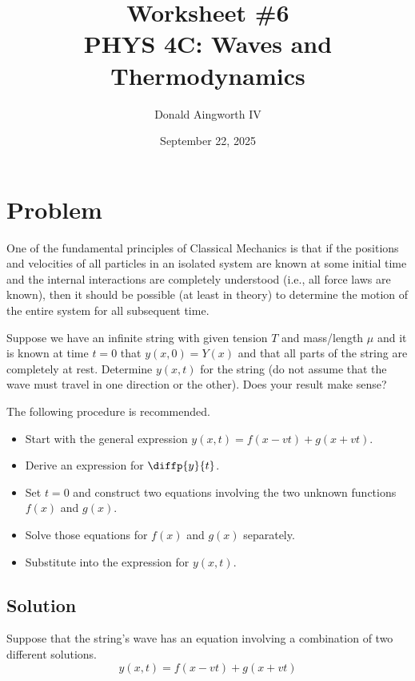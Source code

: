 \documentclass[12pt]{article}
\title{
    Worksheet \#6
    \\  \small
    PHYS 4C: Waves and Thermodynamics
    }
\author{Donald Aingworth IV}
\date{September 22, 2025}
\begin{document}

    \maketitle

    \setcounter{section}{1}
    \section*{Problem}
        One of the fundamental principles of Classical Mechanics is that if the positions and velocities of all particles in an isolated system are known at some initial time and the internal interactions are completely understood (i.e., all force laws are known), then it should be possible (at least in theory) to determine the motion of the entire system for all subsequent time.
        
        Suppose we have an infinite string with given tension $T$ and mass/length $\mu$ and it is known at time $t = 0$ that $y(x,0) = Y(x)$ and that all parts of the string are completely at rest. 
        Determine $y(x,t)$ for the string (do not assume that the wave must travel in one direction or the other). 
        Does your result make sense?
        
        The following procedure is recommended.
        \begin{itemize}
            \item   Start with the general expression $y(x,t) = f(x - vt) + g(x + vt)$.
            \item   Derive an expression for $\diffp{y}{t}$.
            \item   Set $t = 0$ and construct two equations involving the two unknown functions $f(x)$ and $g(x)$.
            \item   Solve those equations for $f(x)$ and $g(x)$ separately.
            \item   Substitute into the expression for $y(x,t)$.
        \end{itemize}

        \subsection*{Solution}
            Suppose that the string's wave has an equation involving a combination of two different solutions.
            \begin{equation}
                y(x,t) = f(x - vt) + g(x + vt)
            \end{equation}
\end{document}
